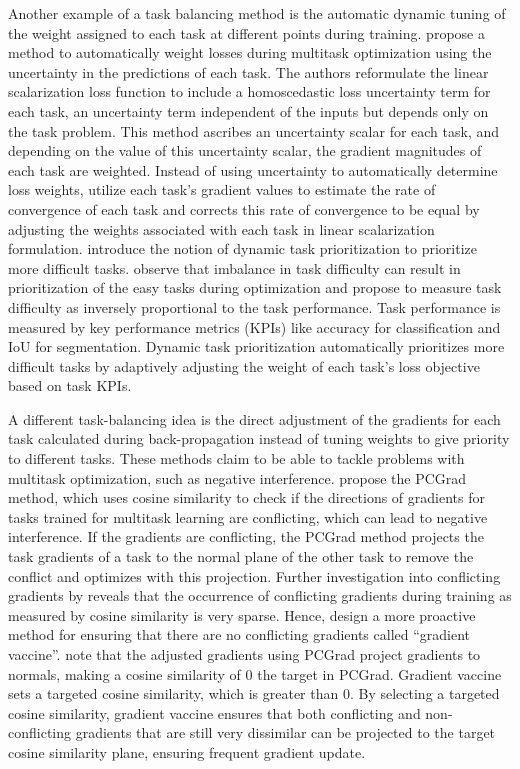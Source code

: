 Another example of a task balancing method is the automatic dynamic tuning of the weight assigned to each task at different points during training. 
\citet{uncertainty_weighting} propose a method to automatically weight losses during multitask optimization using the uncertainty in the predictions of each task. The authors reformulate the linear scalarization loss function to include a homoscedastic loss uncertainty term for each task, an uncertainty term independent of the inputs but depends only on the task problem. This method ascribes an uncertainty scalar for each task, and depending on the value of this uncertainty scalar, the gradient magnitudes of each task are weighted. Instead of using uncertainty to automatically determine loss weights, \citet{gradnorm} utilize each task's gradient values to estimate the rate of convergence of each task and corrects this rate of convergence to be equal by adjusting the weights associated with each task in linear scalarization formulation.
\citet{Dynamic_task_prioritization} introduce the notion of dynamic task prioritization to prioritize more difficult tasks. \citet{Dynamic_task_prioritization} observe that imbalance in task difficulty can result in prioritization of the easy tasks during optimization and propose to measure task difficulty as inversely proportional to the task performance. Task performance is measured by key performance metrics (KPIs) like accuracy for classification and IoU for segmentation. Dynamic task prioritization automatically prioritizes more difficult tasks by adaptively adjusting the weight of each task's loss objective based on task KPIs. 

A different task-balancing idea is the direct adjustment of the gradients for each task calculated during back-propagation instead of tuning weights to give priority to different tasks. These methods claim to be able to tackle problems with multitask optimization, such as negative interference. \citet{pcgrad_paper} propose the PCGrad method, which uses cosine similarity to check if the directions of gradients for tasks trained for multitask learning are conflicting, which can lead to negative interference. If the gradients are conflicting, the PCGrad method projects the task gradients of a task to the normal plane of the other task to remove the conflict and optimizes with this projection. Further investigation into conflicting gradients by \citet{grad_vac} reveals that the occurrence of conflicting gradients during training as measured by cosine similarity is very sparse. Hence, \citet{grad_vac} design a more proactive method for ensuring that there are no conflicting gradients called ``gradient vaccine''. \citet{grad_vac} note that the adjusted gradients using PCGrad project gradients to normals, making a cosine similarity of 0 the target in PCGrad. Gradient vaccine sets a targeted cosine similarity, which is greater than 0. By selecting a targeted cosine similarity, gradient vaccine ensures that both conflicting and non-conflicting gradients that are still very dissimilar can be projected to the target cosine similarity plane, ensuring frequent gradient update.   

